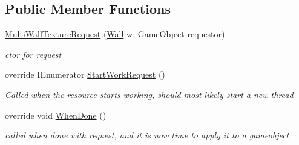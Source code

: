 \subsection*{Public Member Functions}
\begin{DoxyCompactItemize}
\item 
\mbox{\hyperlink{class_multi_wall_texture_request_a03bbf57a2eb2ef24894f7f4d6dadd439}{Multi\+Wall\+Texture\+Request}} (\mbox{\hyperlink{class_wall}{Wall}} w, Game\+Object requestor)
\begin{DoxyCompactList}\small\item\em ctor for request \end{DoxyCompactList}\item 
override I\+Enumerator \mbox{\hyperlink{class_multi_wall_texture_request_a9990230b6a9cb6be581b7948f379065b}{Start\+Work\+Request}} ()
\begin{DoxyCompactList}\small\item\em Called when the resource starts working, should most likely start a new thread \end{DoxyCompactList}\item 
override void \mbox{\hyperlink{class_multi_wall_texture_request_a96afd031b54eb8f09658fa1930b7d7f7}{When\+Done}} ()
\begin{DoxyCompactList}\small\item\em called when done with request, and it is now time to apply it to a gameobject \end{DoxyCompactList}\end{DoxyCompactItemize}
